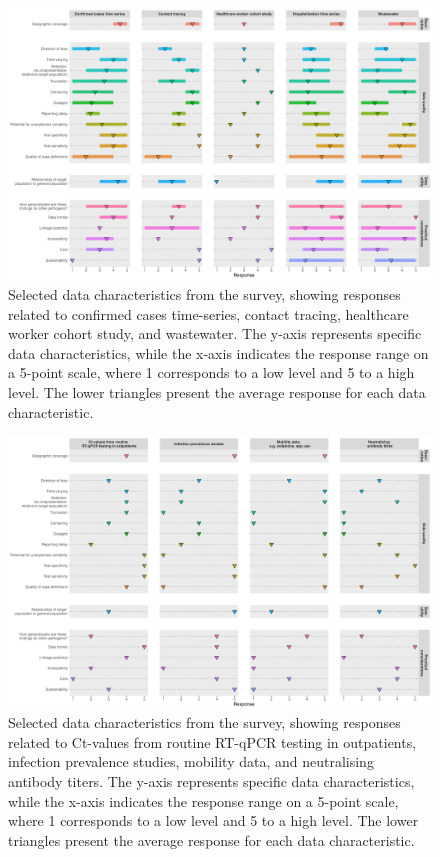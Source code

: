 \documentclass{article}
\begin{document}
\begin{landscape}
{}

    \begin{figure}[H] 
\includegraphics[width=1\linewidth]{supplement_figures/survey_responses_3.png}
\centering
\caption{Selected data characteristics from the survey, showing responses related to confirmed cases time-series, contact tracing, healthcare worker cohort study, and wastewater. The y-axis represents specific data characteristics, while the x-axis indicates the response range on a 5-point scale, where 1 corresponds to a low level and 5 to a high level. The lower triangles present the average response for each data characteristic.}
\label{survey_responses}
\end{figure}
    \begin{figure}[H] 
\includegraphics[width=1\linewidth]{supplement_figures/survey_responses_4.png}
\centering
\caption{Selected data characteristics from the survey, showing responses related to Ct-values from routine RT-qPCR testing in outpatients, infection prevalence studies, mobility data, and neutralising antibody titers. The y-axis represents specific data characteristics, while the x-axis indicates the response range on a 5-point scale, where 1 corresponds to a low level and 5 to a high level. The lower triangles present the average response for each data characteristic.}
\label{survey_responses}
\end{figure}
\end{landscape}
\end{document}
